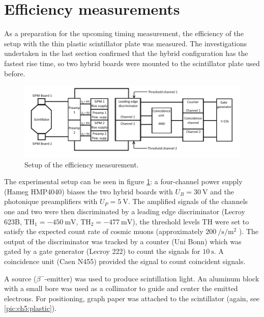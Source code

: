 \section{Efficiency measurements}
As a preparation for the upcoming timing measurement, the efficiency of the setup with the thin plastic scintillator plate was measured. The investigations undertaken in the last section confirmed that the hybrid configuration has the fastest rise time, so two hybrid boards were mounted to the scintillator plate used before.
\begin{figure}[b]
	\centering
	\includegraphics[width=1\linewidth]{./graphics/ch5/scheme_spatial.png}
	\caption[Schematic of the efficiency measurement]{Setup of the efficiency measurement.}
	\label{fig:ch5:scheme_counting}
\end{figure}
The experimental setup can be seen in figure \ref{fig:ch5:scheme_counting}: a four-channel power supply (Hameg HMP4040) biases the two hybrid boards with $U_{B}=\SI{30}{\volt}$ and the photonique preamplifiers with $U_{P}=\SI{5}{\volt}$. The amplified signals of the channels one and two were then discriminated by a leading edge discriminator (Lecroy 623B, TH$_1=\SI{-450}{\milli\volt}$, TH$_2=\SI{-477}{\milli\volt}$), the threshold levels TH were set to satisfy the expected count rate of cosmic muons (approximately $\SI{200}{\per\second\per\meter\squared}$ \cite{PDG}). The output of the discriminator was tracked by a counter (Uni Bonn) which was gated by a gate generator (Lecroy 222) to count the signals for $\SI{10}{\second}$. A coincidence unit (Caen N455) provided the signal to count coincident signals. \par 
A \sr{} source ($\beta^{-}$-emitter) was used to produce scintillation light. An aluminum block with a small bore was used as a collimator to guide and center the emitted electrons. For positioning, graph paper was attached to the scintillator (again, see \ref{pic:ch5:plastic}). \par
